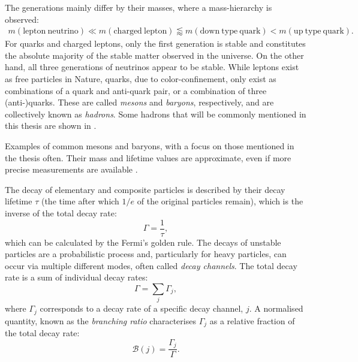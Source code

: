 The generations mainly differ by their masses, where a mass-hierarchy is observed: 
\begin{align*}
    m(\mathrm{lepton~neutrino})\ll m(\mathrm{charged~lepton})\lessapprox m(\mathrm{down~type~quark})<m(\mathrm{up~type~quark}).
\end{align*}
For quarks and charged leptons, only the first generation is stable and constitutes the absolute majority of the stable matter observed in the universe.
On the other hand, all three generations of neutrinos appear to be stable.
While leptons exist as free particles in Nature, quarks, due to color-confinement, 
only exist as combinations of a quark and anti-quark pair, or a combination of three (anti-)quarks.
These are called \textit{mesons} and \textit{baryons}, respectively, and are collectively known as \textit{hadrons}.
Some hadrons that will be commonly mentioned in this thesis are shown in .
\begin{table}[htbp!]
    \centering
    \caption{\label{tab:hadrons}
    Examples of common mesons and baryons, with a focus on those mentioned in the thesis often.
    Their mass and lifetime values are approximate, even if more precise measurements are available \cite{Workman:2022ynf}.
    }
    
\end{table}

The decay of elementary and composite particles is described by their decay lifetime $\tau$ (the time after which $1/e$ of the original particles remain), 
which is the inverse of the total decay rate:
\begin{equation}
    \Gamma = \frac{1}{\tau},
\end{equation}
which can be calculated by the Fermi's golden rule.
The decays of unstable particles are a probabilistic process and, particularly for heavy particles, can occur via multiple different modes, often called \textit{decay channels}.
The total decay rate is a sum of individual decay rates:
\begin{equation}
    \Gamma = \sum_j\Gamma_j,
\end{equation}
where $\Gamma_j$ corresponds to a decay rate of a specific decay channel, $j$.
A normalised quantity, known as the \textit{branching ratio} characterises $\Gamma_j$ as a relative fraction of the total decay rate:
\begin{equation}
    \mathcal{B}(j) = \frac{\Gamma_j}{\Gamma}.
\end{equation}



